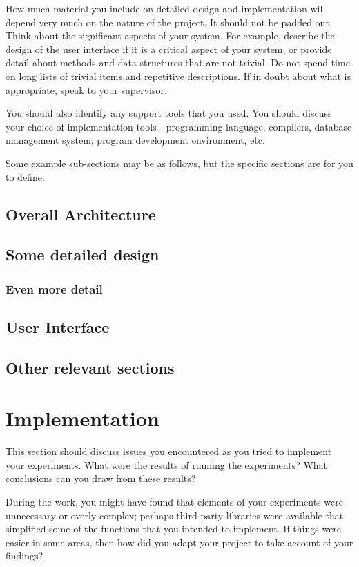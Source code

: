 How much material you include on detailed design and implementation will depend very much on the nature of the project. It should not be padded out. Think about the significant aspects of your system. For example, describe the design of the user interface if it is a critical aspect of your system, or provide detail about methods and data structures that are not trivial. Do not spend time on long lists of trivial items and repetitive descriptions. If in doubt about what is appropriate, speak to your supervisor.
 
You should also identify any support tools that you used. You should discuss your choice of implementation tools - programming language, compilers, database management system, program development environment, etc.

Some example sub-sections may be as follows, but the specific sections are for you to define. 

\subsection{Overall Architecture}

\subsection{Some detailed design}

\subsubsection{Even more detail}

\subsection{User Interface}

\subsection{Other relevant sections}

\section{Implementation}

This section should discuss issues you encountered as you tried to implement your experiments. What were the results of running the experiments? What conclusions can you draw from these results? 

During the work, you might have found that elements of your experiments were unnecessary or overly complex; perhaps third party libraries were available that simplified some of the functions that you intended to implement. If things were easier in some areas, then how did you adapt your project to take account of your findings?

